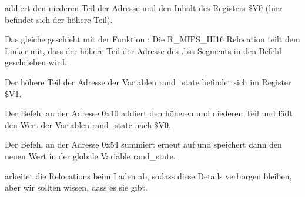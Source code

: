 \SW addiert den niederen Teil der Adresse und den Inhalt des Registers \$V0 (hier befindet sich der höhere Teil).

Das gleiche geschieht mit der Funktion : Die R\_MIPS\_HI16 Relocation teilt dem Linker mit, dass der
höhere Teil der Adresse des .bss Segments in den Befehl \LUI geschrieben wird.

Der höhere Teil der Adresse der Variablen rand\_state befindet sich im Register \$V1.

Der Befehl \LW an der Adresse 0x10 addiert den höheren und niederen Teil und lädt den Wert der Variablen rand\_state
nach \$V0.

Der Befehl \SW an der Adresse 0x54 summiert erneut auf und speichert dann den neuen Wert in der globale Variable
rand\_state.

\IDA arbeitet die Relocations beim Laden ab, sodass diese Details verborgen bleiben, aber wir sollten wissen, dass es
sie gibt.
